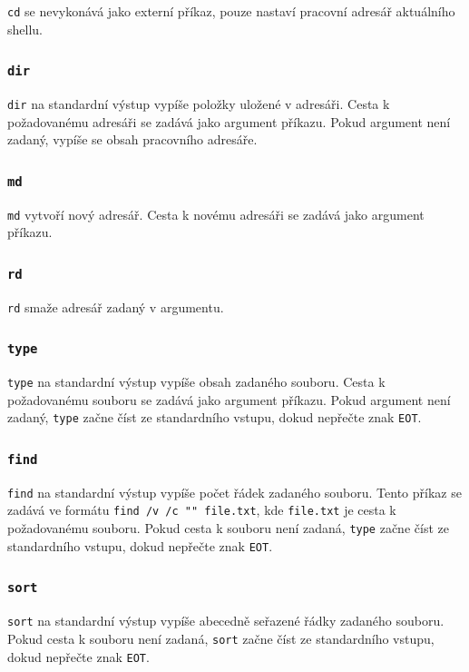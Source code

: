 \documentclass[12pt, a4paper]{article}
\begin{document}
    \texttt{cd} se nevykonává jako externí příkaz, pouze nastaví pracovní adresář aktuálního shellu.
    
    \subsubsection*{\texttt{dir}}
    \texttt{dir} na standardní výstup vypíše položky uložené v adresáři. Cesta k požadovanému adresáři se zadává jako argument příkazu. Pokud argument není zadaný, vypíše se obsah pracovního adresáře.
    
    \subsubsection*{\texttt{md}}
    \texttt{md} vytvoří nový adresář. Cesta k novému adresáři se zadává jako argument příkazu.
    
    \subsubsection*{\texttt{rd}}
    \texttt{rd} smaže adresář zadaný v argumentu.
    
    \subsubsection*{\texttt{type}}
    \texttt{type} na standardní výstup vypíše obsah zadaného souboru. Cesta k požadovanému souboru se zadává jako argument příkazu. Pokud argument není zadaný, \texttt{type} začne číst ze standardního vstupu, dokud nepřečte znak \texttt{EOT}.
    
    \subsubsection*{\texttt{find}}
    \texttt{find} na standardní výstup vypíše počet řádek zadaného souboru. Tento příkaz se zadává ve formátu \texttt{find /v /c "{}"{} file.txt}, kde \texttt{file.txt} je cesta k požadovanému souboru. Pokud cesta k souboru není zadaná, \texttt{type} začne číst ze standardního vstupu, dokud nepřečte znak \texttt{EOT}.
    
    \subsubsection*{\texttt{sort}}
    \texttt{sort} na standardní výstup vypíše abecedně seřazené řádky zadaného souboru. Pokud cesta k souboru není zadaná, \texttt{sort} začne číst ze standardního vstupu, dokud nepřečte znak \texttt{EOT}.
    
\end{document}
